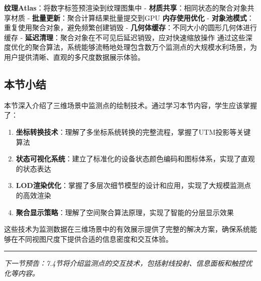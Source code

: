 \textbf{纹理Atlas}：将数字标签预渲染到纹理图集中 - \textbf{材质共享}：相同状态的聚合对象共享材质 - \textbf{批量更新}：聚合计算结果批量提交到GPU \textbf{内存使用优化} - \textbf{对象池模式}：重复使用聚合对象，避免频繁创建销毁 - \textbf{几何体缓存}：不同大小的圆形几何体进行缓存 - \textbf{延迟清理}：聚合对象在不可见后延迟销毁，应对快速缩放操作 通过这些深度优化的聚合算法，系统能够流畅地处理包含数万个监测点的大规模水利场景，为用户提供清晰、直观的多尺度数据展示体验。 \subsection{本节小结}\label{ux672cux8282ux5c0fux7ed3} 本节深入介绍了三维场景中监测点的绘制技术。通过学习本节内容，学生应该掌握了： \begin{enumerate} \def\labelenumi{\arabic{enumi}.} \item \textbf{坐标转换技术}：理解了多坐标系统转换的完整流程，掌握了UTM投影等关键算法 \item \textbf{状态可视化系统}：建立了标准化的设备状态颜色编码和图标体系，实现了直观的状态表达 \item \textbf{LOD渲染优化}：掌握了多层次细节模型的设计和应用，实现了大规模监测点的高效渲染 \item \textbf{聚合显示策略}：理解了空间聚合算法原理，实现了智能的分层显示效果 \end{enumerate} 这些技术为监测数据在三维场景中的有效展示提供了完整的解决方案，确保系统能够在不同视图尺度下提供合适的信息密度和交互体验。 \begin{center}\rule{0.5\linewidth}{0.5pt}\end{center} \emph{下一节预告：7.4节将介绍监测点的交互技术，包括射线投射、信息面板和触控优化等内容。}

